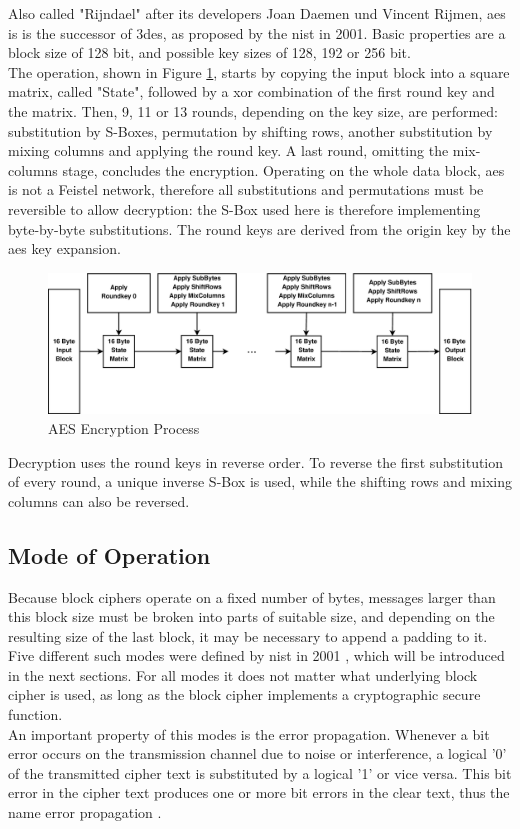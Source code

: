 Also called "Rijndael" after its developers Joan Daemen und Vincent Rijmen, \gls{aes} is is the successor of \gls{3des}, as
proposed by the \gls{nist} in 2001. Basic properties are a block size of 128 bit, and possible key sizes
of 128, 192 or 256 bit.
\\
The operation, shown in Figure \ref{fig:aesEnc}, starts by copying the input block into a square matrix, called "State",
followed by a \gls{xor} combination of the first round 
key and the matrix. Then, 9, 11 or 13 rounds, depending on the key size, are performed: substitution by S-Boxes, permutation by shifting rows, 
another substitution by mixing columns and applying the round key. A last round, omitting the mix-columns stage, concludes the encryption.
Operating on the whole data block, \gls{aes} is not a Feistel network, therefore all substitutions and permutations must be reversible to allow decryption: 
the S-Box used here is therefore implementing byte-by-byte substitutions. The round keys are derived from the origin key by the \gls{aes} key expansion.
\begin{figure}
    \centering
    \includegraphics[width=1\textwidth]{figures/aesEnc.eps}
    \caption{AES Encryption Process}
    \label{fig:aesEnc}
\end{figure}
Decryption uses the round keys in reverse order. To reverse the first substitution of every round, a unique inverse S-Box is used, while the shifting rows
and mixing columns can also be reversed.

\subsection{Mode of Operation}\label{confidentiality}

Because block ciphers  operate on a fixed number of bytes, messages larger than this block size must be broken into parts of suitable size, and depending on 
the resulting size of the last block, it may be necessary to append a padding to it. Five different such modes were defined by \gls{nist} in 2001 \cite{moo},
which will be introduced in the next sections. For all modes it does not matter what underlying block cipher is used, as long as the block cipher implements
a cryptographic secure function. 
\\
An important property of this modes is the error propagation.
Whenever a bit error occurs on the transmission channel due to noise or interference,
a logical '0' of the transmitted cipher text is substituted by a logical '1' or vice versa. This bit error in the cipher text produces one or more bit errors
in the clear text, thus the name error propagation \cite{burda}.


